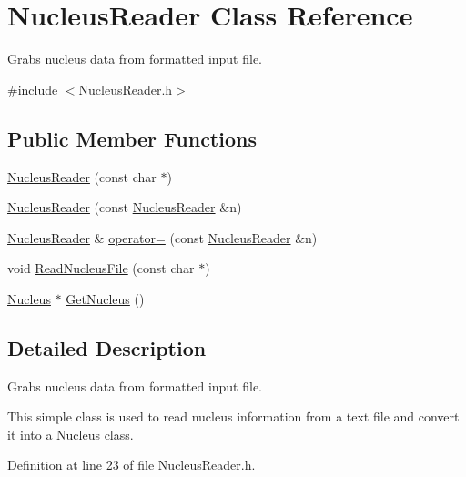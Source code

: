 \hypertarget{classNucleusReader}{\section{Nucleus\-Reader Class Reference}
\label{classNucleusReader}
}


Grabs nucleus data from formatted input file.  




{\ttfamily \#include $<$Nucleus\-Reader.\-h$>$}

\subsection*{Public Member Functions}
\begin{DoxyCompactItemize}
\item 
\hyperlink{classNucleusReader_a82100784a71d3fda919c169d2879cb86}{Nucleus\-Reader} (const char $\ast$)
\item 
\hyperlink{classNucleusReader_a6defdaadcd2d9e5455776f2db5dbb642}{Nucleus\-Reader} (const \hyperlink{classNucleusReader}{Nucleus\-Reader} \&n)
\item 
\hyperlink{classNucleusReader}{Nucleus\-Reader} \& \hyperlink{classNucleusReader_a05621cd02c1a68a3c93ca41e07bf9fd3}{operator=} (const \hyperlink{classNucleusReader}{Nucleus\-Reader} \&n)
\item 
void \hyperlink{classNucleusReader_aa28b2c33ac2940bddfffc13f8792df10}{Read\-Nucleus\-File} (const char $\ast$)
\item 
\hyperlink{classNucleus}{Nucleus} $\ast$ \hyperlink{classNucleusReader_abbbf29086dec2f88f69893d80ade0f92}{Get\-Nucleus} ()
\end{DoxyCompactItemize}


\subsection{Detailed Description}
Grabs nucleus data from formatted input file. 

This simple class is used to read nucleus information from a text file and convert it into a \hyperlink{classNucleus}{Nucleus} class. 

Definition at line 23 of file Nucleus\-Reader.\-h.



